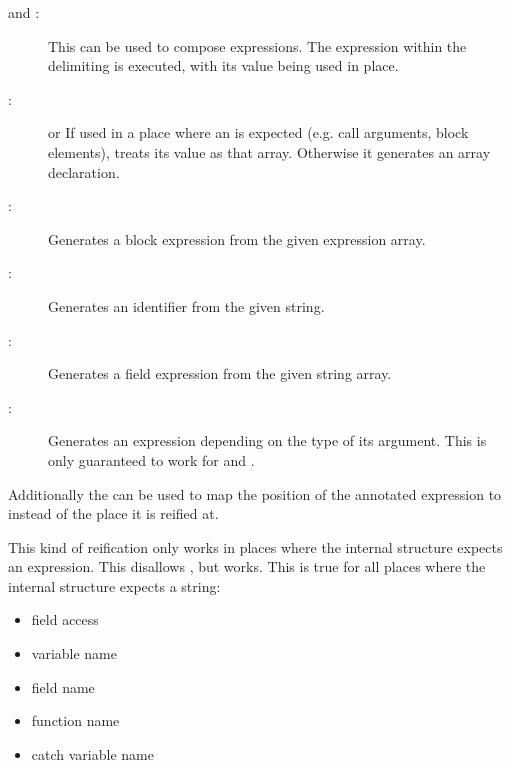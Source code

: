 \begin{description}
	\item[\expr{\$\{\}} and :]  This can be used to compose expressions. The expression within the delimiting \expr{\{ \}} is executed, with its value being used in place.
	\item[:]  or  If used in a place where an  is expected (e.g. call arguments, block elements),  treats its value as that array. Otherwise it generates an array declaration.
	\item[:]  Generates a block expression from the given expression array.
	\item[:]  Generates an identifier from the given string.
	\item[:]  Generates a field expression from the given string array.
	\item[:]  Generates an expression depending on the type of its argument. This is only guaranteed to work for  and .
\end{description}

Additionally the   can be used to map the position of the annotated expression to  instead of the place it is reified at.

This kind of reification only works in places where the internal structure expects an expression. This disallows , but  works. This is true for all places where the internal structure expects a string:

\begin{itemize}
	\item field access 
	\item variable name 
\end{itemize}
\begin{itemize}
	\item field name 
	\item function name 
	\item catch variable name 
\end{itemize}

